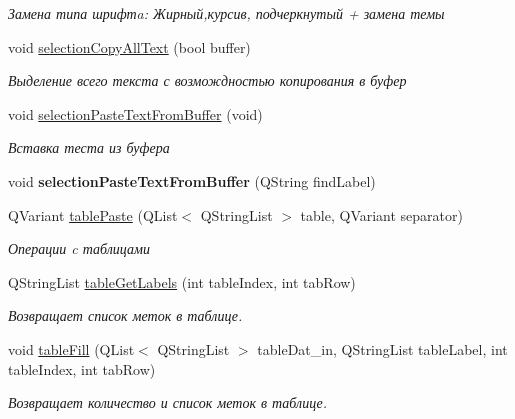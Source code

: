 \begin{DoxyCompactItemize}
\begin{DoxyCompactList}\small\item\em Замена типа шрифтa\+: Жирный,курсив, подчеркнутый + замена темы \end{DoxyCompactList}\item 
void \hyperlink{class_active_word_a259d1196084b9e47b4d5eb70b1c4fb4f}{selection\+Copy\+All\+Text} (bool buffer)
\begin{DoxyCompactList}\small\item\em Выделение всего текста с возмождностью копирования в буфер \end{DoxyCompactList}\item 
void \hyperlink{class_active_word_a5681b16c0f80e616d0fdbc187ad271a1}{selection\+Paste\+Text\+From\+Buffer} (void)
\begin{DoxyCompactList}\small\item\em Вставка теста из буфера \end{DoxyCompactList}\item 
\mbox{\label{class_active_word_a2dd41f4a4f7833b53cb07054a115446f}} 
void {\bfseries selection\+Paste\+Text\+From\+Buffer} (Q\+String find\+Label)
\item 
Q\+Variant \hyperlink{class_active_word_a18b36014a0613fecc40c6ca0b9c43184}{table\+Paste} (Q\+List$<$ Q\+String\+List $>$ table, Q\+Variant separator)
\begin{DoxyCompactList}\small\item\em Операции c таблицами \end{DoxyCompactList}\item 
Q\+String\+List \hyperlink{class_active_word_a61baf0abcfc2e1d2de3e92a05eca3b48}{table\+Get\+Labels} (int table\+Index, int tab\+Row)
\begin{DoxyCompactList}\small\item\em Возвращает список меток в таблице. \end{DoxyCompactList}\item 
void \hyperlink{class_active_word_a03bd81dd1251617cfa32cb82f98872d2}{table\+Fill} (Q\+List$<$ Q\+String\+List $>$ table\+Dat\+\_\+in, Q\+String\+List table\+Label, int table\+Index, int tab\+Row)
\begin{DoxyCompactList}\small\item\em Возвращает количество и список меток в таблице. \end{DoxyCompactList}\item 
\mbox{\label{class_active_word_a54b0d306d9ba5217f76b45944d3fd5c3}} 

\end{DoxyCompactItemize}
